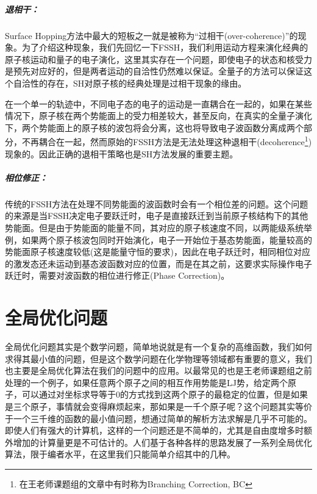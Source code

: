 \documentclass[12pt,a4paper,openany,twoside]{book}
\numberwithin{equation}{section}
\begin{document}
        \paragraph{退相干：}Surface Hopping方法中最大的短板之一就是被称为“过相干(over-coherence)”的现象。为了介绍这种现象，我们先回忆一下FSSH，我们利用运动方程来演化经典的原子核运动和量子的电子演化，这里其实存在一个问题，即使电子的状态和核受力是预先对应好的，但是两者运动的自洽性仍然难以保证。全量子的方法可以保证这个自洽性的存在，SH对原子核的经典处理是过相干现象的缘由。

        在一个单一的轨迹中，不同电子态的电子的运动是一直耦合在一起的，如果在某些情况下，原子核在两个势能面上的受力相差较大，甚至反向，在真实的全量子演化下，两个势能面上的原子核的波包将会分离，这也将导致电子波函数分离成两个部分，不再耦合在一起，然而原始的FSSH方法是无法处理这种退相干(decoherence\footnote{在王老师课题组的文章中有时称为Branching Correction, BC})现象的。因此正确的退相干策略也是SH方法发展的重要主题。
        
        \paragraph{相位修正：}传统的FSSH方法在处理不同势能面的波函数时会有一个相位差的问题。这个问题的来源是当FSSH决定电子要跃迁时，电子是直接跃迁到当前原子核结构下的其他势能面。但是由于势能面的能量不同，其对应的原子核速度不同，以两能级系统举例，如果两个原子核波包同时开始演化，电子一开始位于基态势能面，能量较高的势能面原子核速度较低(这是能量守恒的要求)，因此在电子跃迁时，相同相位对应的激发态还未运动到基态波函数对应的位置，而是在其之前，这要求实际操作电子跃迁时，需要对波函数的相位进行修正(Phase Correction)。

    \chapter{全局优化问题}
      全局优化问题其实是个数学问题，简单地说就是有一个复杂的高维函数，我们如何求得其最小值的问题，但是这个数学问题在化学物理等领域都有重要的意义，我们也主要是全局优化算法在我们的问题中的应用。以最常见的也是王老师课题组之前处理的一个例子，如果任意两个原子之间的相互作用势能是LJ势，给定两个原子，可以通过对坐标求导等于0的方式找到这两个原子的最稳定的位置，但是如果是三个原子，事情就会变得麻烦起来，那如果是一千个原子呢？这个问题其实等价于一个三千维的函数的最小值问题，想通过简单的解析方法求解是几乎不可能的。即使人们有强大的计算机，这样的一个问题还是不简单的，尤其是自由度增多时额外增加的计算量更是不可估计的。人们基于各种各样的思路发展了一系列全局优化算法，限于编者水平，在这里我们只能简单介绍其中的几种。
\end{document}

